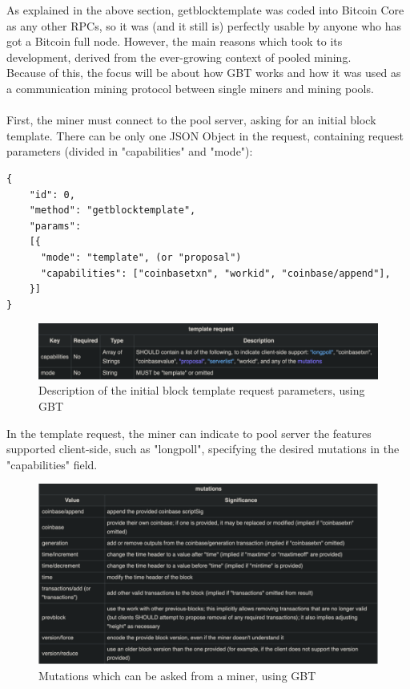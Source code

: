 As explained in the above section, getblocktemplate was coded into Bitcoin Core as any other RPCs, so it was (and it still is) perfectly usable by anyone who has got a Bitcoin full node. However, the main reasons which took to its development, derived from the ever-growing context of pooled mining. \\
Because of this, the focus will be about how GBT works and how it was used as a communication mining protocol between single miners and mining pools.\\\\
First, the miner must connect to the pool server, asking for an initial block template. There can be only one JSON Object in the request, containing request parameters (divided in "capabilities" and "mode"):
\begin{verbatim}
{
    "id": 0, 
    "method": "getblocktemplate", 
    "params": 
    [{
      "mode": "template", (or "proposal")	
      "capabilities": ["coinbasetxn", "workid", "coinbase/append"],
    }]
}
\end{verbatim}

\begin{figure}[h!]
\centering
\includegraphics[width=15cm]{Figures/gbt/gbt2.png}
\caption{Description of the initial block template request parameters, using GBT}
\label{fig:gbt2}
\end{figure}

\noindent In the template request, the miner can indicate to pool server the features supported client-side, such as "longpoll", specifying the desired mutations in the "capabilities" field. \newpage

\begin{figure}[h!]
\centering
\includegraphics[width=15cm]{Figures/gbt/gbt3.png}
\caption{Mutations which can be asked from a miner, using GBT \cite{bitcoin0023Bitcoin}}
\label{fig:gbt3}
\end{figure}

